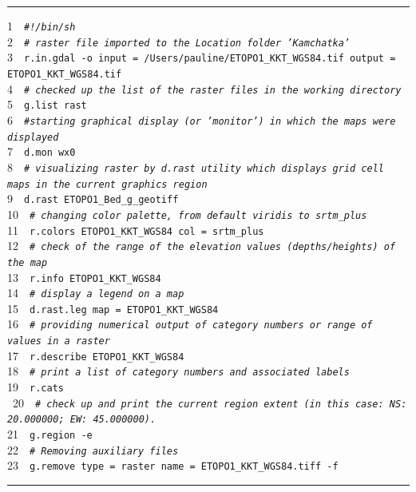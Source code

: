 \documentclass[technologies,article,accept,pdftex,moreauthors]{Definitions/mdpi}
\begin{document}
\begin{listing}[H]
\caption{GRASS GIS %
 script for mapping ETOPO1 raster file.}\label{lst01}
\rule{\columnwidth}{1pt}
\raggedright
1~~\texttt{\emph{\#!/bin/sh\\}}
2~~\texttt{\emph{\# raster file imported to the Location folder 'Kamchatka'\\}}
3~~\texttt{r.in.gdal -o input = /Users/pauline/ETOPO1\_KKT\_WGS84.tif output = ETOPO1\_KKT\_WGS84.tif}\\ 
4~~\texttt{\emph{\# checked up the list of the raster files in the working directory\\}}
5~~\texttt{g.list rast} \\
6~~\texttt{\emph{\#starting graphical display (or 'monitor') in which the maps were displayed\\}}
7~~\texttt{d.mon wx0}\\
8~~\texttt{\emph{\# visualizing raster by d.rast utility which displays grid cell maps in the current graphics region\\}}
9~~\texttt{d.rast ETOPO1\_Bed\_g\_geotiff \\}
10~~\texttt{\emph{\#  changing color palette, from~default viridis to srtm\_plus\\}}
11~~\texttt{r.colors ETOPO1\_KKT\_WGS84 col = srtm\_plus\\}
12~~\texttt{\emph{\# check of the range of the elevation values (depths/heights) of the map\\}}
13~~\texttt{r.info ETOPO1\_KKT\_WGS84\\}
14~~\texttt{\emph{\# display a legend on a map\\}}
15~~\texttt{d.rast.leg map =  ETOPO1\_KKT\_WGS84 \\}
16~~\texttt{\emph{\# providing numerical output of category numbers or range of values in a raster\\}}
17~~\texttt{r.describe ETOPO1\_KKT\_WGS84 \\}
18~~\texttt{\emph{\#  print a list of category numbers and associated labels\\}}
19~~\texttt{r.cats\\}\
20~~\texttt{\emph{\# check up and print the current region extent (in this case: NS: 20.000000; EW: 45.000000).\\}}
21~~\texttt{g.region -e \\}
22~~\texttt{\emph{\# Removing auxiliary files\\}}
23~~\texttt{g.remove type = raster name = ETOPO1\_KKT\_WGS84.tiff -f\\}
\rule{\columnwidth}{1pt}
\end{listing}
\end{document}
